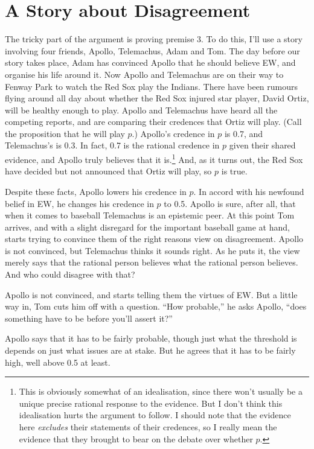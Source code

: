 \section{A Story about Disagreement}
The tricky part of the argument is proving premise 3. To do this, I'll use a story involving four friends, Apollo, Telemachus, Adam and Tom. The day before our story takes place, Adam has convinced Apollo that he should believe EW, and organise his life around it. Now Apollo and Telemachus are on their way to Fenway Park to watch the Red Sox play the Indians. There have been rumours flying around all day about whether the Red Sox injured star player, David Ortiz, will be healthy enough to play. Apollo and Telemachus have heard all the competing reports, and are comparing their credences that Ortiz will play. (Call the proposition that he will play $p$.) Apollo's credence in $p$ is 0.7, and Telemachus's is 0.3. In fact, 0.7 is the rational credence in $p$ given their shared evidence, and Apollo truly believes that it is.\footnote{This is obviously somewhat of an idealisation, since there won't usually be a unique precise rational response to the evidence. But I don't think this idealisation hurts the argument to follow. I should note that the evidence here \textit{excludes} their statements of their credences, so I really mean the evidence that they brought to bear on the debate over whether $p$.}  And, as it turns out, the Red Sox have decided but not announced that Ortiz will play, so $p$ is true.

Despite these facts, Apollo lowers his credence in $p$. In accord with his newfound belief in EW, he changes his credence in $p$ to 0.5. Apollo is sure, after all, that when it comes to baseball Telemachus is an epistemic peer. At this point Tom arrives, and with a slight disregard for the important baseball game at hand, starts trying to convince them of the right reasons view on disagreement. Apollo is not convinced, but Telemachus thinks it sounds right. As he puts it, the view merely says that the rational person believes what the rational person believes. And who could disagree with that?

Apollo is not convinced, and starts telling them the virtues of EW. But a little way in, Tom cuts him off with a question. ``How probable,'' he asks Apollo, ``does something have to be before you'll assert it?'' 

Apollo says that it has to be fairly probable, though just what the threshold is depends on just what issues are at stake.  But he agrees that it has to be fairly high, well above 0.5 at least.

